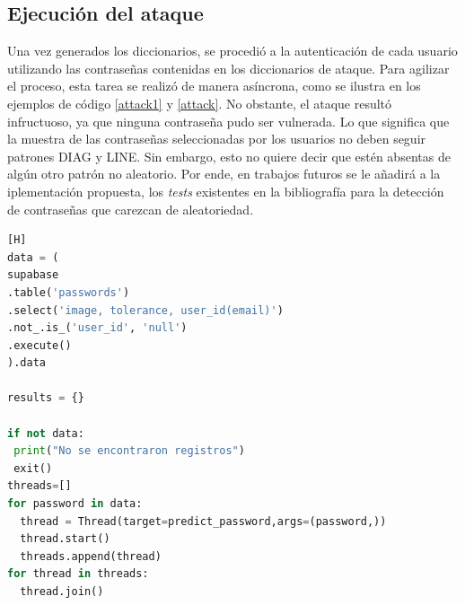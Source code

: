 \subsection{Ejecuci\'on del ataque}


Una vez generados los diccionarios, se procedió a la autenticación de cada usuario utilizando las contraseñas contenidas en los diccionarios de ataque. Para agilizar el proceso, esta tarea se realizó de manera asíncrona, como se ilustra en los ejemplos de código \ref{attack1} y \ref{attack}. No obstante, el ataque resultó infructuoso, ya que ninguna contraseña pudo ser vulnerada. Lo que significa que la muestra de las contrase\~nas seleccionadas por los usuarios no deben seguir patrones DIAG y LINE. Sin embargo, esto no quiere decir que est\'en absentas de alg\'un otro patr\'on no aleatorio. Por ende, en trabajos futuros se le a\~nadir\'a a la iplementaci\'on propuesta, los \textit{tests} existentes en la bibliograf\'ia para la detecci\'on de contrase\~nas que carezcan de aleatoriedad.
\bigskip\bigskip
\begin{lstlisting}[style=mystyle, language=Python, caption=C\'odigo del ataque, label=attack1][H]
data = (
supabase
.table('passwords')
.select('image, tolerance, user_id(email)')
.not_.is_('user_id', 'null')
.execute()
).data

results = {}

if not data:
 print("No se encontraron registros")
 exit()
threads=[]
for password in data:
  thread = Thread(target=predict_password,args=(password,))
  thread.start()
  threads.append(thread)
for thread in threads:
  thread.join()
\end{lstlisting}

\clearpage

